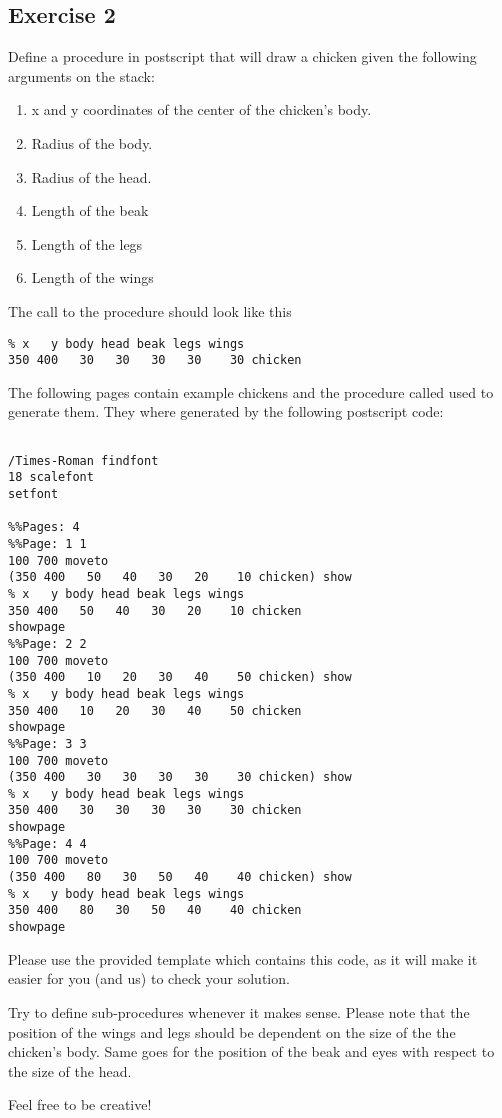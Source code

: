 \documentclass [11pt, twoside]{article}
\begin{document}
\subsection*{Exercise 2}

Define a procedure in postscript that will draw a chicken given the following arguments on the stack: 

\begin{enumerate}

\item x and y coordinates of the center of the chicken's body.
\item Radius of the body.
\item Radius of the head.
\item Length of the beak
\item Length of the legs
\item Length of the wings
\end{enumerate}

The call to the procedure should look like this
\begin{verbatim}
% x   y body head beak legs wings
350 400   30   30   30   30    30 chicken
\end{verbatim}

The following pages contain example chickens and the procedure called used to generate them. They where generated by the following postscript code:

\begin{verbatim}

/Times-Roman findfont
18 scalefont
setfont

%%Pages: 4 
%%Page: 1 1
100 700 moveto
(350 400   50   40   30   20    10 chicken) show 
% x   y body head beak legs wings
350 400   50   40   30   20    10 chicken
showpage
%%Page: 2 2
100 700 moveto
(350 400   10   20   30   40    50 chicken) show 
% x   y body head beak legs wings
350 400   10   20   30   40    50 chicken
showpage
%%Page: 3 3
100 700 moveto
(350 400   30   30   30   30    30 chicken) show 
% x   y body head beak legs wings
350 400   30   30   30   30    30 chicken
showpage
%%Page: 4 4
100 700 moveto 
(350 400   80   30   50   40    40 chicken) show 
% x   y body head beak legs wings
350 400   80   30   50   40    40 chicken
showpage
\end{verbatim}

Please use the provided template which contains this code, as it will make it easier for you (and us) to check your solution.

Try to define sub-procedures whenever it makes sense. Please note that the position of the wings and legs should be dependent on the size of the  the chicken's body. Same goes for the position of the beak and eyes with respect to the size of the head. 

Feel free to be creative!




\end{document}
